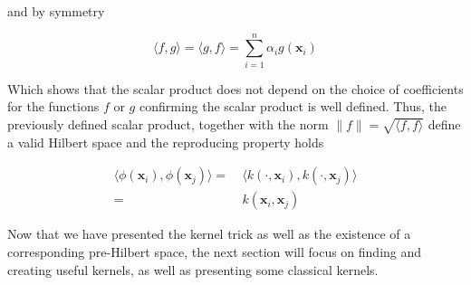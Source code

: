and by symmetry

\begin{equation*}
  \langle f, g\rangle = \langle g, f\rangle = \sum_{i=1}^n\alpha_i g\left(\mathbf{x}_i\right)
\end{equation*}

Which shows that the scalar product does not depend on the choice of coefficients for the functions $f$ or $g$ confirming the scalar product is well defined. Thus, the previously defined scalar product, together with the norm $\|f\| = \sqrt{\langle f, f\rangle }$ define a valid Hilbert space and the reproducing property holds

\begin{equation*}
  \begin{aligned}
    \langle \phi(\mathbf{x}_i), \phi(\mathbf{x}_j)\rangle =\ &\langle k\left(\cdot, \mathbf{x}_i\right), k\left(\cdot, \mathbf{x}_j\right)\rangle \\
    =\ &k(\mathbf{x}_i, \mathbf{x}_j)
  \end{aligned}
\end{equation*}

Now that we have presented the kernel trick as well as the existence of a corresponding pre-Hilbert space, the next section will focus on finding and creating useful kernels, as well as presenting some classical kernels.

